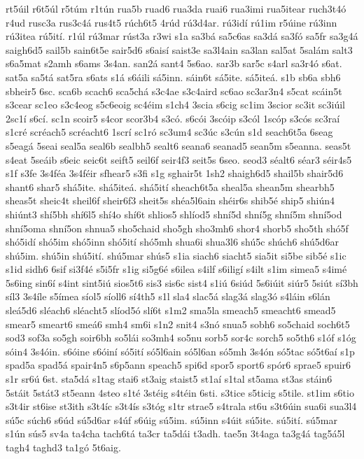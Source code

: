 {rt5úil
r6t5úl
r5túm
r1tún
rua5b
ruad6
rua3da
ruai6
rua3imi
rua5itear
ruch3t4ó
r4ud
rusc3a
rus3c4á
rus4t5
rúch6t5
4rúd
rú3d4ar.
rú3idí
rú1im
r5úine
rú3inn
rú3itea
rú5ití.
r1úl
rú3mar
rúst3a
r3wi
s1a
sa3bá
sa5c6as
sa3dá
sa3fó
sa5fr
sa3g4á
saigh6d5
sail5b
sain6t5e
sair5d6
s6aisí
saist3e
sa3l4ain
sa3lan
sal5at
5salám
salt3
s6a5mat
s2amh
s6ams
3s4an.
san2á
sant4
5s6ao.
sar3b
sar5c
s4arl
sa3r4ó
s6at.
sat5a
sa5tá
sat5ra
s6ats
s1á
s6áili
sá5inn.
sáin6t
sá5ite.
sá5iteá.
s1b
sb6a
sbh6
sbheir5
6sc.
sca6b
scach6
sca5chá
s3c4ae
s3c4aird
sc6ao
sc3ar3n4
s5cat
scáin5t
s3cear
sc1eo
s3c4eog
s5c6eoig
sc4éim
s1ch4
3scia
s6cig
sc1im
3scior
sc3it
sc3iúil
2sc1í
s6cí.
sc1n
scoir5
s4cor
scor3b4
s3có.
s6cói
3scóip
s3cól
1scóp
s3cós
sc3raí
s1cré
scréach5
scréacht6
1scrí
sc1ró
sc3um4
sc3úc
s3cún
s1d
seach6t5a
6seag
s5eagá
5seai
seal5a
seal6b
sealbh5
sealt6
seana6
seanad5
sean5m
s5eanna.
seas5t
s4eat
5seáib
s6eic
seic6t
seift5
seil6f
seir4f3
seit5s
6seo.
seod3
séalt6
séar3
séir4s5
s1f
s3fe
3s4féa
3s4féir
sfhear5
s3fi
s1g
sghair5t
1sh2
shaigh6d5
shail5b
shair5d6
shant6
shar5
shá5ite.
shá5iteá.
shá5ití
sheach6t5a
sheal5a
shean5m
shearbh5
sheas5t
sheic4t
sheil6f
sheir6f3
sheit5s
shéa5l6ain
shéir6s
shib5é
ship5
shiún4
shiúnt3
shí5bh
shí6l5
shí4o
shí6t
shlios5
shlíod5
shní5d
shní5g
shní5m
shní5od
shní5oma
shní5on
shnua5
sho5chaid
sho5gh
sho3mh6
shor4
shorb5
sho5th
shó5f
shó5idí
shó5im
shó5inn
shó5ití
shó5mh
shua6i
shua3l6
shú5c
shúch6
shú5d6ar
shú5im.
shú5in
shú5ití.
shú5mar
shús5
s1ia
siach6
siacht5
sia5it
si5be
sib5é
s1ic
s1id
sidh6
6sif
si3f4é
s5i5fr
s1ig
si5g6é
s6ilea
s4ilf
s6iligí
s4ilt
s1im
simea5
s4imé
5s6ing
sin6í
s4int
sint5iú
sios5t6
sis3
sis6c
sist4
s1iú
6siúd
5s6iúit
siúr5
5siút
sí3bh
síl3
3s4íle
s5ímea
síol5
síoll6
sí4th5
s1l
sla4
slac5á
slag3á
slag3ó
s4láin
s6lán
sleá5d6
sléach6
sléacht5
slíod5ó
slí6t
s1m2
sma5la
smeach5
smeacht6
smead5
smear5
smeart6
smeá6
smh4
sm6i
s1n2
snit4
s3nó
snua5
sobh6
so5chaid
soch6t5
sod3
sof3a
so5gh
soir6bh
so5lái
so3mh4
so5nu
sorb5
sor4c
sorch5
so5th6
s1óf
s1óg
sóin4
3s4óin.
s6óine
s6óiní
só5ití
só5l6ain
só5l6an
só5mh
3s4ón
só5tac
só5t6aí
s1p
spad5a
spad5á
spair4n5
s6p5ann
speach5
spi6d
spor5
sport6
spór6
sprae5
spuir6
s1r
sr6ú
6st.
sta5dá
s1tag
stai6
st3aig
staist5
st1aí
s1tal
st5ama
st3as
stáin6
5stáit
5stát3
st5eann
4steo
s1té
3stéig
s4téin
6sti.
s3tice
s5ticig
s5tile.
st1im
s6tio
s3t4ir
st6ise
st3ith
s3t4íc
s3t4ís
s3tóg
s1tr
strae5
s4trala
st6u
s3t6úin
sua6i
sua3l4
sú5c
súch6
s6úd
sú5d6ar
s4úf
s6úig
sú5im.
sú5inn
s4úit
sú5ite.
sú5ití.
sú5mar
s1ún
sús5
sv4a
ta4cha
tach6tá
ta3cr
ta5dái
t3adh.
tae5n
3t4aga
ta3g4á
tag5á5l
tagh4
taghd3
ta1gó
5t6aig.
}
